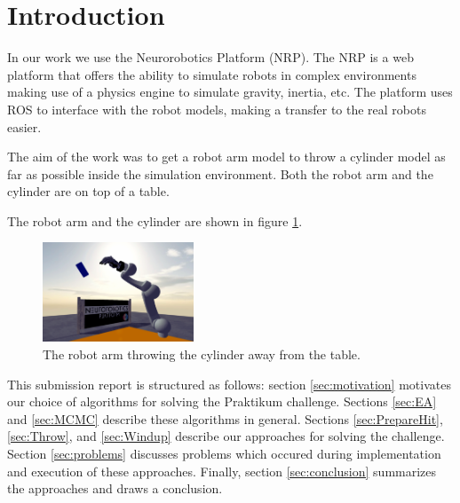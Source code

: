 \section{Introduction}

In our work we use the Neurorobotics Platform (NRP). The NRP is a web platform that offers the ability to simulate robots in complex environments making use of a physics engine to simulate gravity, inertia, etc. The platform uses ROS to interface with the robot models, making a transfer to the real robots easier.

The aim of the work was to get a robot arm model to throw a cylinder model as far as possible inside the simulation environment. Both the robot arm and the cylinder are on top of a table.

The robot arm and the cylinder are shown in figure \ref{fig:challenge}.

\begin{figure}
	\begin{center}
		\includegraphics[width=0.4\textwidth]{hbpprak_2018}
	\end{center}
	\caption{The robot arm throwing the cylinder away from the table.}
	\label{fig:challenge}
\end{figure}

This submission report is structured as follows: section \ref{sec:motivation} motivates our choice of algorithms for solving the  Praktikum challenge. Sections \ref{sec:EA} and \ref{sec:MCMC} describe these algorithms in general. Sections \ref{sec:PrepareHit}, \ref{sec:Throw}, and \ref{sec:Windup} describe our approaches for solving the challenge.
Section \ref{sec:problems} discusses problems which occured during implementation and execution of these approaches. Finally, section \ref{sec:conclusion} summarizes the approaches and draws a conclusion.
